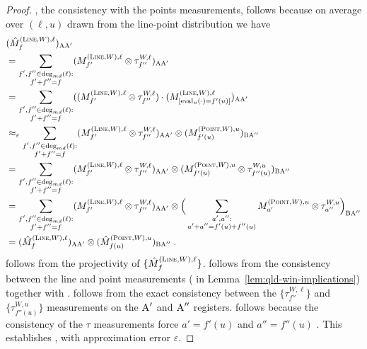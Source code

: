 \documentclass[11pt]{article}
\theoremstyle{definition}
\newcommand{\eps}{\varepsilon}
\newcommand{\labelstyle}[1]{\ensuremath{\textsc{#1}}\xspace}
\newcommand{\alice}{\labelstyle{A}}
\newcommand{\bob}{\labelstyle{B}}
\newcommand{\typestyle}[1]{\ensuremath{\textsc{#1}}\xspace}
\renewcommand{\line}{\mathbf{\ell}}
\newcommand{\Point}{\typestyle{Point}}
\newcommand{\Line}{\typestyle{Line}}
\newcommand{\eval}{\mathrm{eval}}
\begin{document}
\begin{proof}
, the consistency with the points measurements, follows because on average over $(\line,u)$ drawn from the line-point distribution we have
\begin{align}
	&(\hat{M}^{(\Line,W),\line}_f)_{\alice \alice'} \\
	&= \sum_{\substack{f',f'' \in \deg_{md}(\line) : \\ f' + f'' =
  f}} (M^{(\Line,W),\line}_{f'} \otimes \tau^{W,\line}_{f''})_{\alice
  \alice'} \\
        &= \sum_{\substack{f', f'' \in \deg_{md}(\line): \\ f' + f'' =
  f}} ((M^{(\Line, W), \line}_{f'} \otimes \tau^{W, \line}_{f''})
  \cdot (M^{(\Line, W), \line}_{[\eval_u(\cdot) = f'(u)]} )_{\alice
  \alice'} \label{eq:qld-mhat-line-1} \\
	&\approx_\eps \sum_{\substack{f',f'' \in \deg_{md}(\line) : \\
  f' + f'' = f}} (M^{(\Line,W),\line}_{f'} \otimes
  \tau^{W,\line}_{f''})_{\alice \alice'} \otimes
  (M^{(\Point,W),u}_{f'(u)})_{\bob
  \alice''} \label{eq:qld-mhat-line-2} \\
  	&= \sum_{\substack{f',f'' \in \deg_{md}(\line) : \\ f' + f'' =
  f}} (M^{(\Line,W),\line}_{f'} \otimes \tau^{W,\line}_{f''})_{\alice
  \alice'} \otimes (M^{(\Point,W),u}_{f'(u)} \otimes
  \tau^{W,u}_{f''(u)})_{\bob \alice''} \label{eq:qld-mhat-line-3} \\
	&= \sum_{\substack{f',f'' \in \deg_{md}(\line) : \\ f' + f'' =
  f}} (M^{(\Line,W),\line}_{f'} \otimes \tau^{W,\line}_{f''})_{\alice
  \alice'} \otimes \Big (\sum_{\substack{a', a'' : \\ a' + a'' = f'(u)
  + f''(u)}}  M^{(\Point,W),u}_{a'} \otimes \tau^{W,u}_{a''} \Big
  )_{\bob \alice''} \label{eq:qld-mhat-line-4} \\
	&= (\hat{M}^{(\Line,W),\line}_f)_{\alice \alice'} \otimes
   (\hat{M}^{(\Point,W),u}_{f(u)})_{\bob \alice''}\;. \label{eq:qld-comm-line-pt-cons-eps}
\end{align}
 follows from the projectivity of
$\{\hat{M}^{(\Line, W), \line}_{f}\}$.  follows from the consistency between the line
and point measurements ( in
Lemma~\ref{lem:qld-win-implications}) together with
. 
follows from the exact consistency between the $\{ \tau^{W,\line}_{f''} \}$ and $\{
\tau^{W,u}_{f''(u)} \}$ measurements on the $\alice'$ and $\alice''$ registers.  follows because
the consistency of the $\tau$ measurements force $a' = f'(u)$ and $a''
= f''(u)$ . This establishes , with
approximation error $\eps$.


\end{proof}
\end{document}
